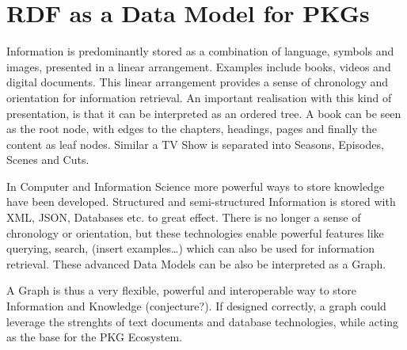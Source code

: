 \chapter{RDF as a Data Model for PKGs} \label{ch:model}




Information is predominantly stored as a combination of language, symbols and images, presented in a linear arrangement. Examples include books, videos and digital documents. This linear arrangement provides a sense of chronology and orientation for information retrieval. An important realisation with this kind of presentation, is that it can be interpreted as an ordered tree. A book can be seen as the root node, with edges to the chapters, headings, pages and finally the content as leaf nodes. Similar a TV Show is separated into Seasons, Episodes, Scenes and Cuts. 

In Computer and Information Science more powerful ways to store knowledge have been developed. Structured and semi-structured Information is stored with XML, JSON, Databases etc. to great effect. There is no longer a sense of chronology or orientation, but these technologies enable powerful features like querying, search, (insert examples…) which can also be used for information retrieval. These advanced Data Models can be also be interpreted as a Graph.

A Graph is thus a very flexible, powerful and interoperable way to store Information and Knowledge (conjecture?). If designed correctly, a graph could leverage the strenghts of text documents and database technologies, while acting as the base for the PKG Ecosystem.

